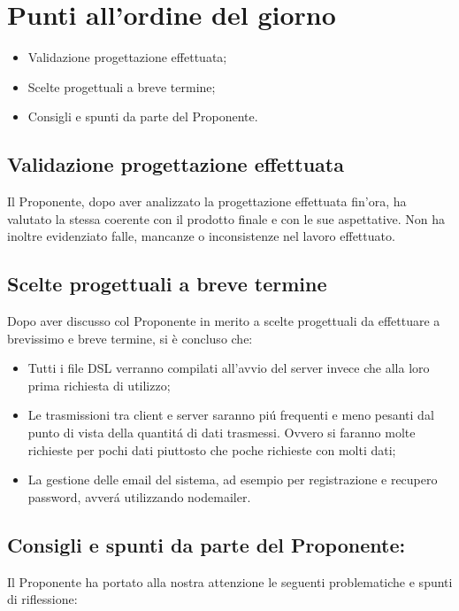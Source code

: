\newpage
\section{Punti all'ordine del giorno}
\label{2}

\begin{itemize}
\item Validazione progettazione effettuata;
\item Scelte progettuali a breve termine;
\item Consigli e spunti da parte del Proponente.
\end{itemize}


\subsection{Validazione progettazione effettuata}
Il Proponente, dopo aver analizzato la progettazione effettuata fin'ora, ha valutato la stessa coerente con il prodotto finale e con le sue aspettative.
Non ha inoltre evidenziato falle, mancanze o inconsistenze nel lavoro effettuato.

\subsection{Scelte progettuali a breve termine}
Dopo aver discusso col Proponente in merito a scelte progettuali da effettuare a brevissimo e breve termine, si è concluso che:

\begin{itemize}
\item Tutti i file DSL verranno compilati all'avvio del server invece che alla loro prima richiesta di utilizzo;
\item Le trasmissioni tra client e server saranno pi\'{u} frequenti e meno pesanti dal punto di vista della quantit\'{a} di dati trasmessi. Ovvero si faranno molte richieste per pochi dati piuttosto che poche richieste con molti dati;
\item La gestione delle email del sistema, ad esempio per registrazione e recupero password, avver\'{a} utilizzando nodemailer.
\end{itemize}


\subsection{Consigli e spunti da parte del Proponente:}
Il Proponente ha portato alla nostra attenzione le seguenti problematiche e spunti di riflessione:

